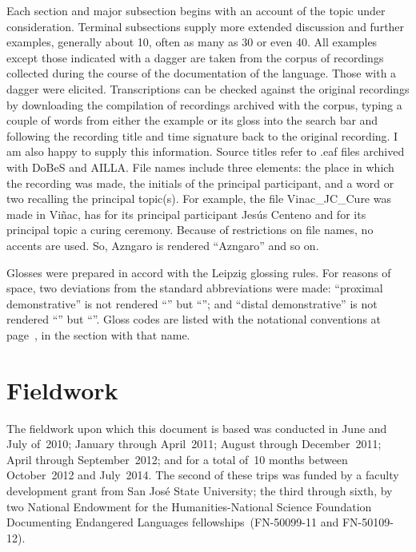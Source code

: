 Each section and major subsection begins with an account of the topic under consideration. Terminal subsections supply more extended discussion and further examples, generally about 10, often as many as 30 or even 40. All examples except those indicated with a dagger are taken from the corpus of recordings collected during the course of the documentation of the language. Those with a dagger were elicited. Transcriptions can be checked against the original recordings by downloading the compilation of recordings archived with the corpus, typing a couple of words from either the example or its gloss into the search bar and following the recording title and time signature back to the original recording. I am also happy to supply this information. Source titles refer to \textrm{.eaf} files archived with DoBeS and AILLA. File names include three elements: the place in which the recording was made, the initials of the principal participant, and a word or two recalling the principal topic(s). For example, the file \textrm{Vinac\_JC\_Cure} was made in Viñac, has for its principal participant Jesús Centeno and for its principal topic a curing ceremony. Because of restrictions on file names, no accents are used. So, Azngaro is rendered “Azngaro” and so on.

Glosses were prepared in accord with the Leipzig glossing rules. For reasons of space, two deviations from the standard abbreviations were made: “proximal demonstrative” is not rendered “” but “”; and “distal demonstrative” is not rendered “” but “”. Gloss codes are listed with the notational conventions at page~\pageref{ch:notconv}, in the section with that name.

\section{Fieldwork} \label{sec:fieldwork}
The fieldwork upon which this document is based was conducted in June and July of~2010; January through April~2011; August through December~2011; April through September~2012; and for a total of~10 months between October~2012 and July~2014. The second of these trips was funded by a faculty development grant from San José State University; the third through sixth, by two National Endowment for the Humanities-National Science Foundation Documenting Endangered Languages fellowships~(FN-50099-11 and FN-50109-12).

